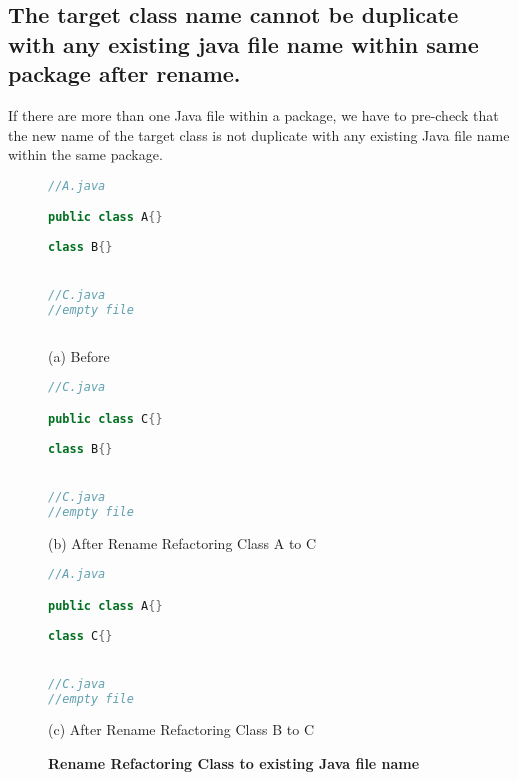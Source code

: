 \subsection{The target class name cannot be duplicate with any existing java file name within same package after rename.}

If there are more than one Java file within a package, we have to pre-check that the new name of the target class is not duplicate with any existing Java file name within the same package. 

\begin{figure}[th]
\centering
\begin{minipage}[t]{0.45\linewidth}
\begin{lstlisting}[language=java, basicstyle=\scriptsize\ttfamily,frame=single]
//A.java

public class A{}
	
class B{}


//C.java
//empty file
 
\end{lstlisting}
\centering(a) Before 
\end{minipage}
\hfill
\begin{minipage}[t]{0.45\linewidth}
\begin{lstlisting}[language=java, basicstyle=\scriptsize\ttfamily,frame=single]
//C.java

public class C{}
	
class B{}


//C.java
//empty file

\end{lstlisting}
\centering(b) After Rename Refactoring Class A to C
\end{minipage}

\centering
\begin{minipage}[t]{0.45\linewidth}
\begin{lstlisting}[language=java, basicstyle=\scriptsize\ttfamily,frame=single]
//A.java

public class A{}
	
class C{}


//C.java
//empty file

\end{lstlisting}
\centering(c) After Rename Refactoring Class B to C
\end{minipage}
\caption{\textbf{Rename Refactoring Class to existing Java file name}}
\label{figure:classFileName}
\end{figure}

